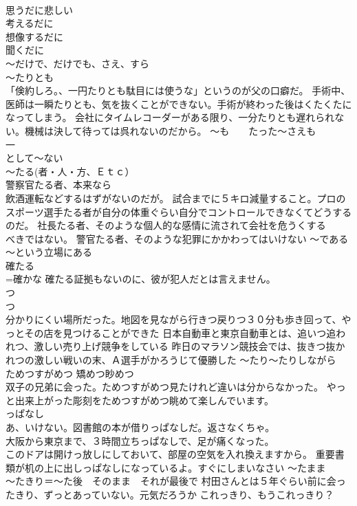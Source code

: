 \documentclass[8pt]{extreport}
\begin{document}
\begin{CJK}{UTF8}{min}
\\	思うだに悲しい 
\\	考えるだに
\\	想像するだに 
\\	聞くだに 
\\	～だけで、だけでも、さえ、すら
\\	～たりとも	
\\	「倹約しろ。、一円たりとも駄目には使うな」というのが父の口癖だ。 手術中、医師は一瞬たりとも、気を抜くことができない。手術が終わった後はくたくたになってしまう。 会社にタイムレコーダーがある限り、一分たりとも遅れられない。機械は決して待っては呉れないのだから。	～も　　たった～さえも 
\\	一
\\	として～ない
\\	～たる(者・人・方、Ｅｔｃ）	
\\	警察官たる者、本来なら
\\	飲酒運転などするはずがないのだが。 試合までに５キロ減量すること。プロのスポーツ選手たる者が自分の体重ぐらい自分でコントロールできなくてどうするのだ。 社長たる者、そのような個人的な感情に流されて会社を危うくする
\\	べきではない。 警官たる者、そのような犯罪にかかわってはいけない	～である　～という立場にある 
\\	確たる
\\	=確かな 確たる証拠もないのに、彼が犯人だとは言えません。
\\	つ
\\	つ	
\\	分かりにくい場所だった。地図を見ながら行きつ戻りつ３０分も歩き回って、やっとその店を見つけることができた 日本自動車と東京自動車とは、追いつ追われつ、激しい売り上げ競争をしている 昨日のマラソン競技会では、抜きつ抜かれつの激しい戦いの末、Ａ選手がかろうじて優勝した	～たり～たりしながら 
\\	ためつすがめつ 矯めつ眇めつ 
\\	双子の兄弟に会った。ためつすがめつ見たけれど違いは分からなかった。 やっと出来上がった彫刻をためつすがめつ眺めて楽しんでいます。
\\	っぱなし	
\\	あ、いけない。図書館の本が借りっぱなしだ。返さなくちゃ。 
\\	大阪から東京まで、３時間立ちっぱなしで、足が痛くなった。 
\\	このドアは開けっ放しにしておいて、部屋の空気を入れ換えますから。 重要書類が机の上に出しっぱなしになっているよ。すぐにしまいなさい	～たまま 
\\	～たきり＝～た後　そのまま　それが最後で 村田さんとは５年ぐらい前に会ったきり、ずっとあっていない。元気だろうか これっきり、もうこれっきり？

\end{CJK}
\end{document}
